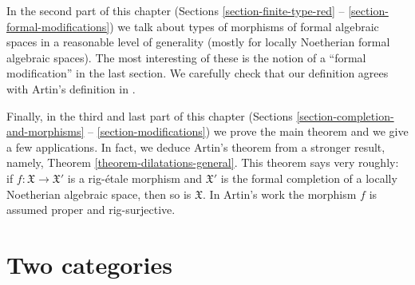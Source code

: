 \documentclass{stacks-project}
\theoremstyle{plain}
\theoremstyle{definition}
\theoremstyle{remark}
\numberwithin{equation}{subsection}
\begin{document}
\medskip\noindent
In the second part of this chapter
(Sections \ref{section-finite-type-red} -- \ref{section-formal-modifications})
we talk about types of morphisms of formal algebraic spaces
in a reasonable level of generality (mostly for locally Noetherian
formal algebraic spaces). The most interesting of these is
the notion of a ``formal modification'' in the last section.
We carefully check that our definition agrees with
Artin's definition in \cite{ArtinII}.

\medskip\noindent
Finally, in the third and last part of this chapter
(Sections \ref{section-completion-and-morphisms} --
\ref{section-modifications}) we prove the main theorem and
we give a few applications.
In fact, we deduce Artin's theorem from a stronger
result, namely, Theorem \ref{theorem-dilatations-general}.
This theorem says very roughly: if $f : \mathfrak X \to \mathfrak X'$
is a rig-\'etale morphism and $\mathfrak X'$ is the formal
completion of a locally Noetherian algebraic space, then so
is $\mathfrak X$. In Artin's work the morphism $f$ is assumed proper
and rig-surjective.









\section{Two categories}
\label{section-two-categories}
\end{document}
